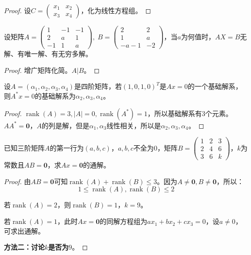 \begin{proof}
	设$C=
	\begin{pmatrix}
		x_1 & x_2 \\
		x_3 & x_4
	\end{pmatrix}$，化为线性方程组。
\end{proof}
\begin{theorem}
	设矩阵$A=
	\begin{pmatrix}
		1 & -1 & -1 \\
		2 & a & 1 \\
		-1 & 1 & a
	\end{pmatrix},\;
	B=
	\begin{pmatrix}
		2 & 2 \\
		1 & a \\
		-a-1 & -2
	\end{pmatrix}$，当$a$为何值时，$AX=B$无解、有唯一解、有无穷多解。
\end{theorem}
\begin{proof}
	增广矩阵化简。$A|B$。
\end{proof}
\begin{theorem}
	设$A=(\alpha_1,\alpha_2,\alpha_3,\alpha_4)$是四阶矩阵，若$(1,0,1,0)^T$是$Ax=0$的一个基础解系，则$A^*x=0$的基础解系为$\alpha_2,\alpha_3,\alpha_4$。
\end{theorem}
\begin{proof}
	$\operatorname{rank}(A)=3,|A|=0,\operatorname{rank}(A^*)=1$，所以基础解系有$3$个元素。$AA^*=\mathbf{0}$，$A$的列是解，但是$\alpha_1,\alpha_3$线性相关，所以是$\alpha_2,\alpha_3,\alpha_4$。
\end{proof}
\begin{theorem}
	已知三阶矩阵$A$的第一行为$(a,b,c)$，$a,b,c$不全为$0$，矩阵$B=\begin{pmatrix}
		1 & 2 & 3 \\
		2 & 4 & 6 \\
		3 & 6 & k
	\end{pmatrix}$，$k$为常数且$AB=\mathbf{0}$，求$Ax=\mathbf{0}$的通解。
\end{theorem}
\begin{proof}
	由$AB=\mathbf{0}$可知$\operatorname{rank}(A)+\operatorname{rank}(B)\leqslant3$。因为$A\ne\mathbf{0},B\ne\mathbf{0}$，所以：
	\begin{equation*}
		1\leqslant\operatorname{rank}(A),\operatorname{rank}(B)\leqslant2
	\end{equation*}\par
	若$\operatorname{rank}(A)=2$，则$\operatorname{rank}(B)=1$，$k=9$。\par
	若$\operatorname{rank}(A)=1$，此时$Ax=\mathbf{0}$的同解方程组为$ax_1+bx_2+cx_3=0$，设$a\ne0$，可求出通解。\par 
	\textbf{方法二：讨论$k$是否为$9$}。
\end{proof}


